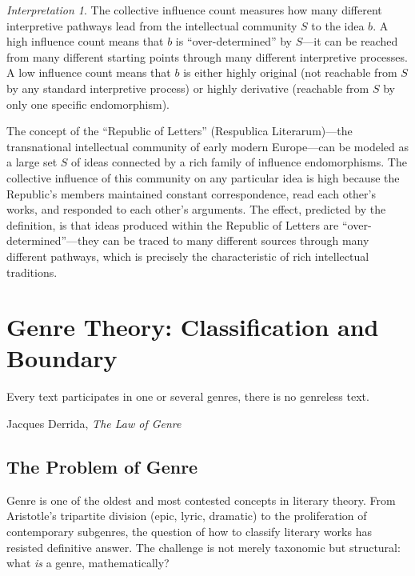 \documentclass[11pt,openany]{book}
\theoremstyle{definition}
\theoremstyle{plain}
\theoremstyle{remark}
\newtheorem{interpretation}[axiom]{Interpretation}
\begin{document}
\begin{interpretation}
The collective influence count measures how many different interpretive pathways lead from the intellectual community $S$ to the idea $b$. A high influence count means that $b$ is ``over-determined'' by $S$---it can be reached from many different starting points through many different interpretive processes. A low influence count means that $b$ is either highly original (not reachable from $S$ by any standard interpretive process) or highly derivative (reachable from $S$ by only one specific endomorphism).

The concept of the ``Republic of Letters'' (Respublica Literarum)---the transnational intellectual community of early modern Europe---can be modeled as a large set $S$ of ideas connected by a rich family of influence endomorphisms. The collective influence of this community on any particular idea is high because the Republic's members maintained constant correspondence, read each other's works, and responded to each other's arguments. The effect, predicted by the definition, is that ideas produced within the Republic of Letters are ``over-determined''---they can be traced to many different sources through many different pathways, which is precisely the characteristic of rich intellectual traditions.
\end{interpretation}


\chapter{Genre Theory: Classification and Boundary}
\label{ch:genre}

\epigraph{Every text participates in one or several genres, there is no genreless text.}{Jacques Derrida, \textit{The Law of Genre}}

\section{The Problem of Genre}

Genre is one of the oldest and most contested concepts in literary theory. From Aristotle's tripartite division (epic, lyric, dramatic) to the proliferation of contemporary subgenres, the question of how to classify literary works has resisted definitive answer. The challenge is not merely taxonomic but structural: what \emph{is} a genre, mathematically?
\end{document}
